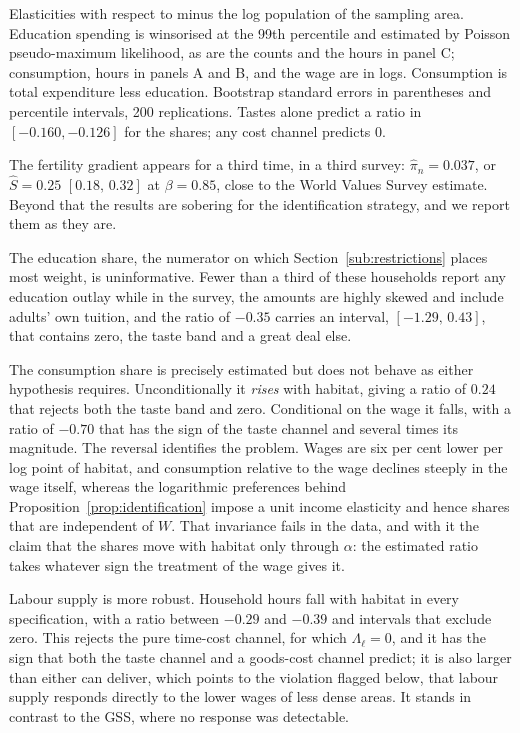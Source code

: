 \documentclass[11pt]{article}
\begin{document}
\begin{table}[h!]
\begin{threeparttable}
\begin{tablenotes}
\item Elasticities with respect to minus the log population of the sampling area. Education
spending is winsorised at the 99th percentile and estimated by Poisson pseudo-maximum likelihood,
as are the counts and the hours in panel C; consumption, hours in panels A and B, and the wage are
in logs. Consumption is total expenditure less education. Bootstrap standard errors in
parentheses and percentile intervals, 200 replications. Tastes alone predict a ratio in
$[-0.160,-0.126]$ for the shares; any cost channel predicts $0$.
\end{tablenotes}
\end{threeparttable}
\end{table}

The fertility gradient appears for a third time, in a third survey: $\hat\pi_n=0.037$, or
$\hat S=0.25$ $[0.18,\,0.32]$ at $\beta=0.85$, close to the World Values Survey estimate. Beyond
that the results are sobering for the identification strategy, and we report them as they are.

The education share, the numerator on which Section~\ref{sub:restrictions} places most weight, is
uninformative. Fewer than a third of these households report any education outlay while in the survey, the
amounts are highly skewed and include adults' own tuition, and the ratio of $-0.35$ carries an
interval, $[-1.29,\,0.43]$, that contains zero, the taste band and a great deal else.

The consumption share is precisely estimated but does not behave as either hypothesis requires.
Unconditionally it \emph{rises} with habitat, giving a ratio of $0.24$ that rejects both the
taste band and zero. Conditional on the wage it falls, with a ratio of $-0.70$ that has the sign of
the taste channel and several times its magnitude. The reversal identifies the problem. Wages are
six per cent lower per log point of habitat, and consumption relative to the wage declines steeply
in the wage itself, whereas the logarithmic preferences behind
Proposition~\ref{prop:identification} impose a unit income elasticity and hence shares that are
independent of $W$. That invariance fails in the data, and with it the claim that the shares move
with habitat only through $\alpha$: the estimated ratio takes whatever sign the treatment of the
wage gives it.

Labour supply is more robust. Household hours fall with habitat in every specification, with a
ratio between $-0.29$ and $-0.39$ and intervals that exclude zero. This rejects the pure time-cost
channel, for which $\Lambda_\ell=0$, and it has the sign that both the taste channel and a
goods-cost channel predict; it is also larger than either can deliver, which points to the
violation flagged below, that labour supply responds directly to the lower wages of less dense
areas. It stands in contrast to the GSS, where no response was detectable.
\end{document}
